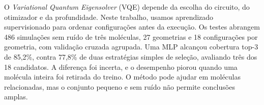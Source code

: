 O \textit{Variational Quantum Eigensolver} (VQE) depende da escolha do circuito,
do otimizador e da profundidade. Neste trabalho, usamos aprendizado
supervisionado para ordenar configurações antes da execução. Os testes abrangem
486 simulações sem ruído de três moléculas, 27 geometrias e 18 configurações por
geometria, com validação cruzada agrupada. Uma MLP alcançou cobertura top-3 de
85,2\%, contra 77,8\% de duas estratégias simples de seleção, avaliando três dos
18 candidatos. A diferença foi incerta, e o desempenho piorou quando uma
molécula inteira foi retirada do treino. O método pode ajudar em moléculas
relacionadas, mas o conjunto pequeno e sem ruído não permite conclusões amplas.
